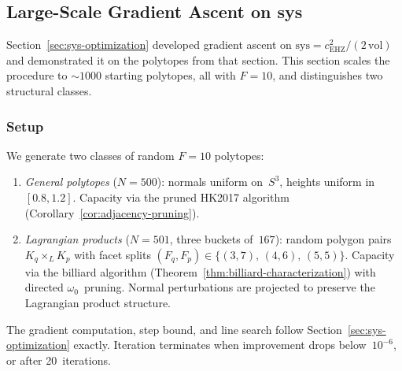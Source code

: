 %
%
%

\subsection{Large-Scale Gradient Ascent on sys}
\label{sec:gradient-descent}

Section~\ref{sec:sys-optimization} developed gradient ascent on
$\mathrm{sys} = c_{\mathrm{EHZ}}^2 / (2\,\mathrm{vol})$ and
demonstrated it on the polytopes from that section.
This section scales the procedure to ${\sim}1000$ starting polytopes,
all with $F = 10$, and distinguishes two structural classes.

\subsubsection*{Setup}

We generate two classes of random $F = 10$ polytopes:
\begin{enumerate}
\item \emph{General polytopes} ($N = 500$):
  normals uniform on~$S^3$, heights uniform in~$[0.8, 1.2]$.
  Capacity via the pruned HK2017 algorithm
  (Corollary~\ref{cor:adjacency-pruning}).

\item \emph{Lagrangian products} ($N = 501$, three buckets of~$167$):
  random polygon pairs $K_q \times_L K_p$ with facet splits
  $(F_q, F_p) \in \{(3,7),\,(4,6),\,(5,5)\}$.
  Capacity via the billiard algorithm
  (Theorem~\ref{thm:billiard-characterization}) with directed
  $\omega_0$~pruning.
  Normal perturbations are projected to preserve the Lagrangian product
  structure.
\end{enumerate}

The gradient computation, step bound, and line search follow
Section~\ref{sec:sys-optimization} exactly.
Iteration terminates when improvement drops below~$10^{-6}$,
or after 20~iterations.

